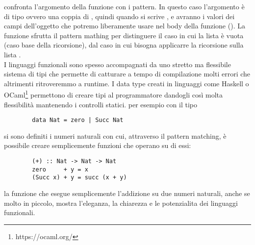      confronta l'argomento della funzione con i pattern. In questo caso l'argomento è di tipo  ovvero
    una coppia di , quindi quando si scrive ,  e  avranno i valori dei campi dell'oggetto 
    che potremo liberamente usare nel body della funzione ().
    La funzione  sfrutta il pattern mathing per distinguere il caso in cui la lista è vuota  (caso base della ricorsione), dal caso in cui
    bisogna applicarre la ricorsione sulla lista . 
    \\I linguaggi funzionali sono spesso accompagnati da uno stretto ma flessibile sistema di tipi
    che permette di catturare a tempo di compilazione molti errori che altrimenti ritroveremmo a runtime. I data type creati in linguaggi come Haskell o OCaml\footnote{https://ocaml.org/}
    permettono di creare tipi al programmatore dandogli così molta flessibilità mantenendo i controlli statici. per esempio con il tipo 
    \begin{verbatim}
        data Nat = zero | Succ Nat
    \end{verbatim}
    si sono definiti i numeri naturali con cui, attraverso il pattern matching, è possibile creare semplicemente funzioni che operano su di essi:
    \begin{verbatim}
        (+) :: Nat -> Nat -> Nat
        zero     + y = x
        (Succ x) + y = succ (x + y) 
    \end{verbatim}
    la funzione \code{(+)} che esegue semplicemente l'addizione su due numeri naturali, anche se molto in piccolo, mostra l'eleganza, la chiarezza e le potenzialita dei linguaggi funzionali.